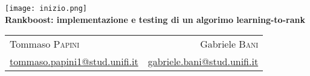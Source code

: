 \begin{center}
   	\texttt{[image: inizio.png]}\\[0.8cm]
	{\huge\bfseries Rankboost: implementazione e testing di un algorimo learning-to-rank}
\end{center}

\begin{tabular}{lr}
	Tommaso \textsc{Papini} & Gabriele \textsc{Bani}\\
	\href{mailto:tommaso.papini1@stud.unifi.it}{tommaso.papini1@stud.unifi.it} & \href{mailto:gabriele.bani@stud.unifi.it}{gabriele.bani@stud.unifi.it}
\end{tabular}\\[1.2cm]
